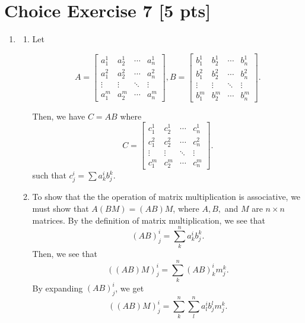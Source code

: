 \documentclass{article}
\begin{document}
\section*{Choice Exercise 7 [5 pts]}

\begin{enumerate}
    \item[2.] {
        \begin{enumerate}
            \item {
                Let

                \[A =
                    \begin{bmatrix}
                    a^1_1 & a^1_2 & \cdots & a^1_n \\
                    a^2_1 & a^2_2 & \cdots & a^2_n \\
                    \vdots & \vdots & \ddots & \vdots \\
                    a^m_1 & a^m_2 & \cdots & a^m_n
                    \end{bmatrix},
                B = 
                \begin{bmatrix}
                    
                    b^1_1 & b^1_2 & \cdots & b^1_n \\
                    b^2_1 & b^2_2 & \cdots & b^2_n \\
                    \vdots & \vdots & \ddots & \vdots \\
                    b^m_1 & b^m_2 & \cdots & b^m_n
                \end{bmatrix}.
                \]

                Then, we have \(C = AB\) where
                \[C = 
                \begin{bmatrix}
                    
                    c^1_1 & c^1_2 & \cdots & c^1_n \\
                    c^2_1 & c^2_2 & \cdots & c^2_n \\
                    \vdots & \vdots & \ddots & \vdots \\
                    c^m_1 & c^m_2 & \cdots & c^m_n
                \end{bmatrix}.
                \]
                such that \(c^i_j = \sum{a^i_k b^k_j}\).
            }
            \item {
                To show that the the operation of matrix multiplication is 
                associative, we must show that \(A(BM) = (AB)M\), where 
                \(A, B,\) and \(M\) are \(n\times n\) matrices. By the definition
                of matrix multiplication, we see that 
                \[(AB)^i_j = \sum_k^n{a^i_kb^k_j}.\]
                Then, we see that
                \[((AB)M)^i_j = \sum_k^n{(AB)^i_k m^k_j}.\]
                By expanding \((AB)^i_j\), we get 
                \[((AB)M)^i_j = \sum_k^n{\sum_l^n{a^i_l b^l_j} m^k_j}.\]

}
\end{enumerate}}
\end{enumerate}
\end{document}
